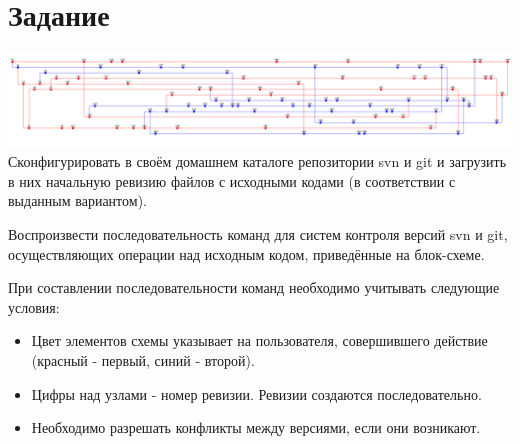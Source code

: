 \documentclass{scrreprt}
\begin{document}
	\chapter{Задание}
	
	\includegraphics[width=\textwidth]{task.png}
	 Сконфигурировать в своём домашнем каталоге репозитории svn и git и загрузить в них начальную ревизию файлов с исходными кодами (в соответствии с выданным вариантом).
	
	Воспроизвести последовательность команд для систем контроля версий svn и git, осуществляющих операции над исходным кодом, приведённые на блок-схеме.
	
	При составлении последовательности команд необходимо учитывать следующие условия:
	\begin{itemize}
	\item Цвет элементов схемы указывает на пользователя, совершившего действие (красный - первый, синий - второй).
	\item Цифры над узлами - номер ревизии. Ревизии создаются последовательно.
	\item Необходимо разрешать конфликты между версиями, если они возникают.
	\end{itemize}
\end{document}
